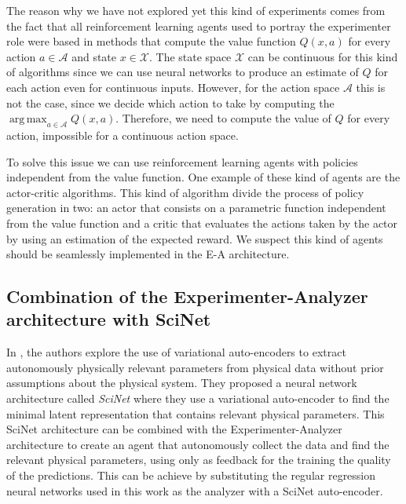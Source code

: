 \documentclass[11pt,a4paper,twoside]{report}
\DeclareMathOperator*{\argmax}{arg\,max}
\newcommand{\+}{\textnormal{+} }
\theoremstyle{definition}
\numberwithin{equation}{chapter}
\begin{document}
The reason why we have not explored yet this kind of experiments comes from the
fact that all reinforcement learning agents used to portray the experimenter
role were based in methods that compute the value function $Q(x,a)$ for every
action $a\in \mathcal{A}$ and state $x \in \mathcal{X}$. The state space
$\mathcal{X}$ can be continuous for this kind of algorithms since we can use
neural networks to produce an estimate of $Q$ for each action even for
continuous inputs. However, for the action space $\mathcal{A}$ this is not the
case, since we decide which action to take by computing the $\argmax_{a \in
\mathcal{A}} Q(x,a)$. Therefore, we need to compute the value of $Q$ for every
action, impossible for a continuous action space. \par To solve this issue we
can use reinforcement learning agents with policies independent from the value
function. One example of these kind of agents are the actor-critic algorithms.
This kind of algorithm divide the process of policy generation in two: an actor
that consists on a parametric function independent from the value function and a
critic that evaluates the actions taken by the actor by using an estimation of
the expected reward. We suspect this kind of agents should be seamlessly
implemented in the E-A architecture.

\subsection{Combination of the Experimenter-Analyzer architecture with SciNet}

In \cite{iten2020discovering}, the authors explore the use of variational
auto-encoders to extract autonomously physically relevant parameters from
physical data without prior assumptions about the physical system. They proposed
a neural network architecture called \textit{SciNet} where they use a
variational auto-encoder to find the minimal latent representation that contains
relevant physical parameters. This SciNet architecture can be combined with the
Experimenter-Analyzer architecture to create an agent that autonomously collect
the data and find the relevant physical parameters, using only as feedback for
the training the quality of the predictions. This can be achieve by substituting
the regular regression neural networks used in this work as the analyzer with a
SciNet auto-encoder.
\end{document}

